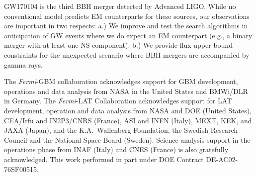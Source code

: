 \documentclass{aastex61}
\begin{document}
GW170104 is the third BBH merger detected by Advanced LIGO. While no conventional model predicts EM counterparts for these sources, our observations are important in two respects: a.) We improve and test the search algorithms in anticipation of GW events where we do expect an EM counterpart (e.g., a binary merger with at least one NS component). b.) We provide flux upper bound constraints for the unexpected scenario where BBH mergers are accompanied by gamma rays.

The \textit{Fermi}-GBM collaboration acknowledges support for GBM development, operations and data analysis from NASA in the United States and BMWi/DLR in Germany. The \textit{Fermi}-LAT Collaboration acknowledges support for LAT development, operation and data analysis from NASA and DOE (United States), CEA/Irfu and IN2P3/CNRS (France), ASI and INFN (Italy), MEXT, KEK, and JAXA (Japan), and the K.A.~Wallenberg Foundation, the Swedish Research Council and the National Space Board (Sweden). Science analysis support in the operations phase from INAF (Italy) and CNES (France) is also gratefully acknowledged. This work performed in part under DOE Contract DE-AC02-76SF00515.
\end{document}
